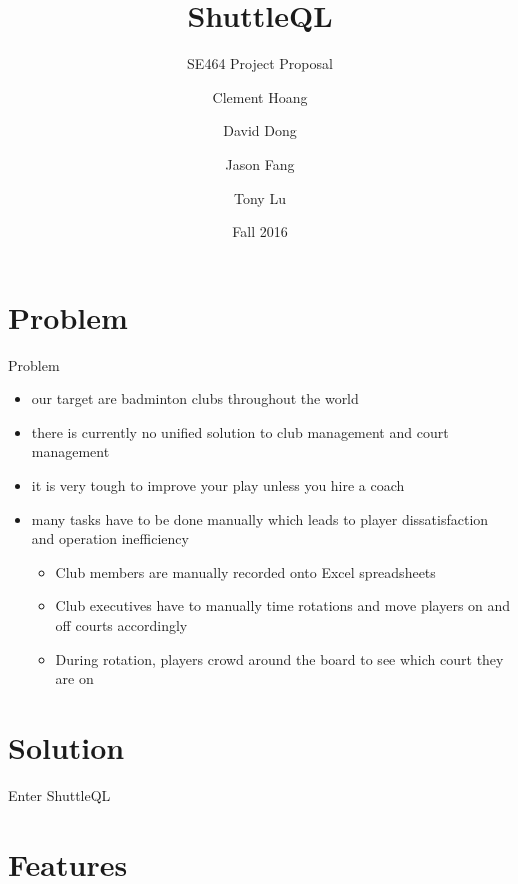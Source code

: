 \documentclass{beamer}
\title{ShuttleQL}
\subtitle{SE464 Project Proposal}
\author{Clement Hoang \and David Dong \and Jason Fang \and Tony Lu}
\institute{University of Waterloo}
\date{Fall 2016}
\begin{document}
\begin{frame}
  \titlepage
\end{frame}

\section{Problem}

\begin{frame}{Problem}
  \begin{itemize}
  \item {
    our target are \alert{badminton clubs} throughout the world
  }
  \item {
    there is currently no unified solution to \alert{club management} and \alert{court management}
  }
  \item {
    it is very tough to \alert{improve} your play unless you hire a coach
  }
  \item {
    many tasks have to be done \alert{manually} which leads to \alert{player dissatisfaction} and \alert{operation inefficiency}
    \begin{itemize}
        \item
          Club members are manually recorded onto Excel spreadsheets
        \item
          Club executives have to manually time rotations and move players on and off courts accordingly
        \item
          During rotation, players crowd around the board to see which court they are on
    \end{itemize}
  }
  \end{itemize}
\end{frame}

\section{Solution}

\begin{frame}{Enter ShuttleQL}

\end{frame}

\section{Features}
\end{document}
